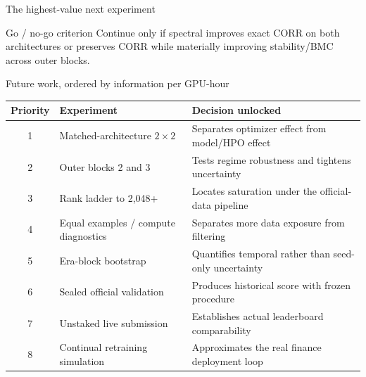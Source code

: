 \documentclass[aspectratio=169,10pt]{beamer}
\begin{document}
\begin{frame}{The highest-value next experiment}
  \vspace{0.5em}
  \begin{block}{Go / no-go criterion}
    Continue only if spectral improves exact CORR on both architectures or preserves CORR while materially improving stability/BMC across outer blocks.
  \end{block}
\end{frame}

\begin{frame}{Future work, ordered by information per GPU-hour}
  \small
  \begin{tabular}{clp{7.6cm}}
    \toprule
    Priority & Experiment & Decision unlocked \\
    \midrule
    1 & Matched-architecture $2\times2$ & Separates optimizer effect from model/HPO effect \\
    2 & Outer blocks 2 and 3 & Tests regime robustness and tightens uncertainty \\
    3 & Rank ladder to 2,048+ & Locates saturation under the official-data pipeline \\
    4 & Equal examples / compute diagnostics & Separates more data exposure from filtering \\
    5 & Era-block bootstrap & Quantifies temporal rather than seed-only uncertainty \\
    6 & Sealed official validation & Produces historical score with frozen procedure \\
    7 & Unstaked live submission & Establishes actual leaderboard comparability \\
    8 & Continual retraining simulation & Approximates the real finance deployment loop \\
    \bottomrule
  \end{tabular}
\end{frame}
\end{document}
